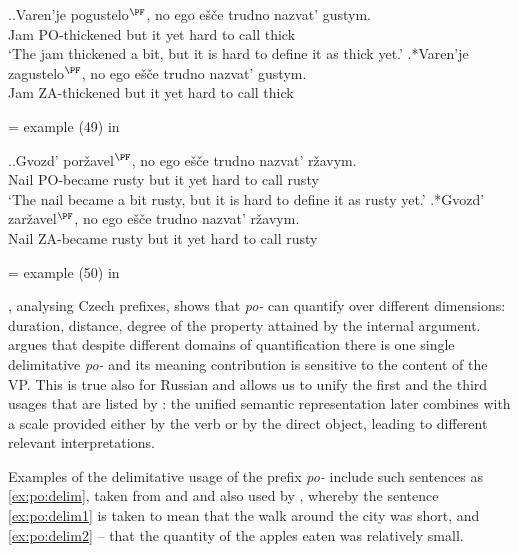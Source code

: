 \ex.\label{ex:Brag:pogustet}\ag.Varen'je pogustelo$^{\PF}$, no ego e\v{s}\v{c}e trudno nazvat' gustym.\\
Jam PO-thickened but it yet hard {to call} thick\\
\vspace{0.5em}
`The jam thickened a bit, but it is hard to define it as thick yet.'
\bg.*Varen'je zagustelo$^{\PF}$, no ego e\v{s}\v{c}e trudno nazvat' gustym.\\
Jam ZA-thickened but it yet hard {to call} thick\\
\begin{flushright}
= example (49) in \citealt[183]{Braginsky:08}
\end{flushright}

\ex.\label{ex:Brag:porzhavet}\ag.Gvozd' por\v{z}avel$^{\PF}$, no ego e\v{s}\v{c}e trudno nazvat' r\v{z}avym.\\
Nail {PO-became rusty} but it yet hard {to call} rusty\\
\vspace{0.5em}
`The nail became a bit rusty, but it is hard to define it as rusty yet.'
\bg.*Gvozd' zar\v{z}avel$^{\PF}$, no ego e\v{s}\v{c}e trudno nazvat' r\v{z}avym.\\
Nail {ZA-became rusty} but it yet hard {to call} rusty\\
\begin{flushright}
= example (50) in \citealt[183]{Braginsky:08}
\end{flushright}

\citet{Souchkova:04}, analysing Czech prefixes, shows that \textit{po-} can quantify over different dimensions: duration, distance, degree of the property attained by the internal argument. \citeauthor{Souchkova:04} argues that despite different domains of quantification there is one single delimitative \textit{po-} and its meaning contribution is sensitive to the content of the VP. This is true also for Russian and allows us to unify the first and the third usages that are listed by \citet{Shvedova:82}: the unified semantic representation later combines with a scale provided either by the verb or by the direct object, leading to different relevant interpretations.

Examples of the delimitative usage of the prefix \textit{po-} include such sentences as \ref{ex:po:delim}, taken from \citet{Filip:00} and \citet{Souchkova:04} and also used by \citet{Kagan:book}, whereby the sentence \ref{ex:po:delim1} is taken to mean that the walk around the city was short, and \ref{ex:po:delim2} -- that the quantity of the apples eaten was relatively small.

